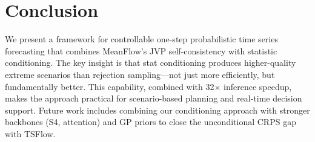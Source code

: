 \documentclass{article}
\begin{document}
\section{Conclusion}

We present a framework for controllable one-step probabilistic time series forecasting that combines MeanFlow's JVP self-consistency with statistic conditioning. The key insight is that stat conditioning produces higher-quality extreme scenarios than rejection sampling---not just more efficiently, but fundamentally better. This capability, combined with 32$\times$ inference speedup, makes the approach practical for scenario-based planning and real-time decision support. Future work includes combining our conditioning approach with stronger backbones (S4, attention) and GP priors to close the unconditional CRPS gap with TSFlow.



\end{document}
